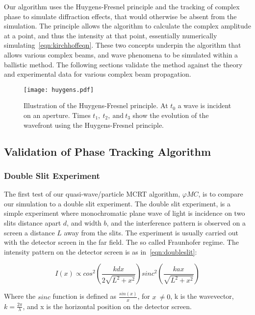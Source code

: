 Our algorithm uses the Huygens-Fresnel principle and the tracking of complex phase to simulate diffraction effects, that would otherwise be absent from the simulation.
The principle allows the algorithm to calculate the complex amplitude at a point, and thus the intensity at that point, essentially numerically simulating~\cref{eqn:kirchhoffeqn}.
These two concepts underpin the algorithm that allows various complex beams, and wave phenomena to be simulated within a ballistic method. The following sections validate the method against the theory and experimental data for various complex beam propagation.

\begin{figure}[!ht]
    \centering
    \texttt{[image: huygens.pdf]}
    \caption{Illustration of the Huygens-Fresnel principle. At $t_0$ a wave is incident on an aperture. Times $t_1,\ t_2,\ \text{and}\ t_3$ show the evolution of the wavefront using the Huygens-Fresnel principle.}
    \label{fig:huygensillis}
\end{figure}

\subsection{Validation of Phase Tracking Algorithm}

\subsubsection*{Double Slit Experiment}

The first test of our quasi-wave/particle MCRT algorithm, $\varphi MC$, is to compare our simulation to a double slit experiment.
The double slit experiment, is a simple experiment where monochromatic plane wave of light is incidence on two slits distance apart $d$, and width $b$, and the interference pattern is observed on a screen a distance $L$ away from the slits. The experiment is usually carried out with the detector screen in the far field. The so called Fraunhofer regime.
The intensity pattern on the detector screen is as in~\cref{eqn:doubleslit}:

\begin{equation}
    I(x) \propto cos^2\left(\frac{kdx}{2\sqrt{L^2+x^2}}\right)sinc^2\left(\frac{kax}{\sqrt{L^2+x^2}}\right)
    \label{eqn:doubleslit}
\end{equation}

Where the $sinc$ function is defined as $\tfrac{sin(x)}{x}$, for $x\ \neq 0$, k is the wavevector, $k=\tfrac{2\pi}{\lambda}$, and x is the horizontal position on the detector screen.

